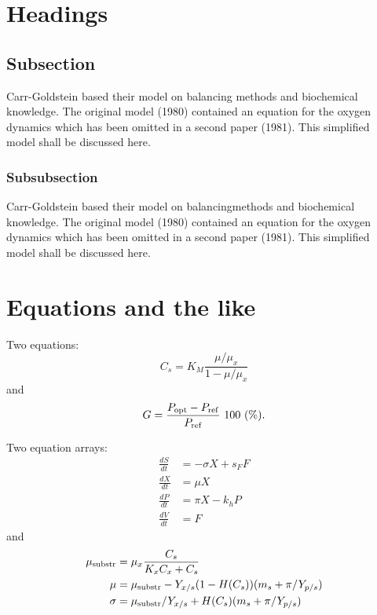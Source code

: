 \documentclass[cjm]{ipart}
\theoremstyle{plain}
\begin{document}
\section{Headings}

\subsection{Subsection}
Carr-Goldstein based their model on balancing methods and
biochemical know\-ledge. The original model (1980) contained an equation for the
oxygen dynamics which has been omitted in a second paper
(1981). This simplified model shall be discussed here.

\subsubsection{Subsubsection}
Carr-Goldstein
based their model on balancing\break methods and
biochemical know\-ledge. The original model (1980) contained an equation for the
oxygen dynamics which has been omitted in a second paper
(1981). This simplified model shall be discussed here.

\section{Equations and the like}

Two equations:
\begin{equation}
    C_{s}  =  K_{M} \frac{\mu/\mu_{x}}{1-\mu/\mu_{x}} \label{ccs}
\end{equation}
and
\begin{equation}
    G = \frac{P_{\rm opt} - P_{\rm ref}}{P_{\rm ref}} \mbox{\ }100 \mbox{\ }(\%).
\end{equation}

Two equation arrays:
\begin{align}
  \frac{dS}{dt} & =  - \sigma X + s_{F} F\\
  \frac{dX}{dt} & =    \mu    X\\
  \frac{dP}{dt} & =    \pi    X - k_{h} P\\
  \frac{dV}{dt} & =    F
\end{align}
and
\begin{align}
 \mu_{\rm substr} & =  \mu_{x} \frac{C_{s}}{K_{x}C_{x}+C_{s}}  \\
 \mu              & =  \mu_{\rm substr} - Y_{x/s}(1-H(C_{s}))(m_{s}+\pi /Y_{p/s}) \\
 \sigma           & =  \mu_{\rm substr}/Y_{x/s}+ H(C_{s}) (m_{s}+ \pi /Y_{p/s})
\end{align}
\end{document}
